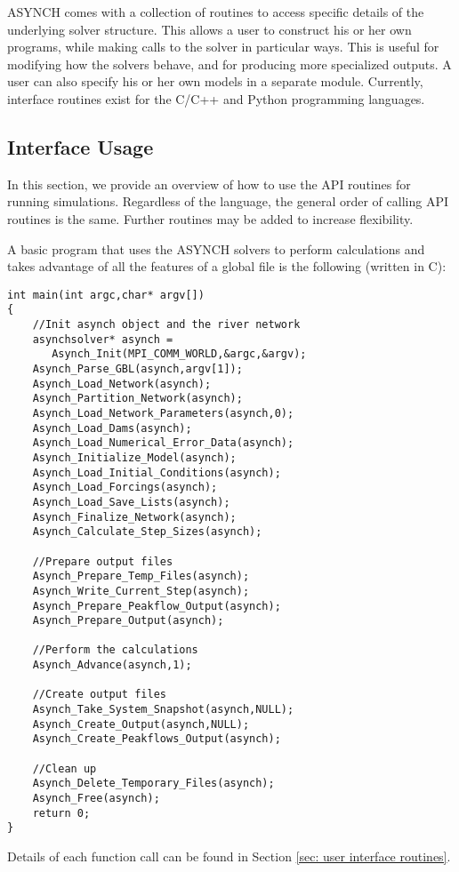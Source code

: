 \documentclass[12pt]{article}
\begin{document}
ASYNCH comes with a collection of routines to access specific details of the underlying solver structure. This allows a user to construct his or her own programs, while making calls to the solver in particular ways. This is useful for modifying how the solvers behave, and for producing more specialized outputs. A user can also specify his or her own models in a separate module. Currently, interface routines exist for the C/C++ and Python programming languages.

\subsection{Interface Usage} \label{sec: interface usage}

In this section, we provide an overview of how to use the API routines for running simulations. Regardless of the language, the general order of calling API routines is the same. Further routines may be added to increase flexibility.

A basic program that uses the ASYNCH solvers to perform calculations and takes advantage of all the features of a global file is the following (written in C):
\begin{lstlisting}[style=CStyle]
int main(int argc,char* argv[])
{
	//Init asynch object and the river network
	asynchsolver* asynch = 
	   Asynch_Init(MPI_COMM_WORLD,&argc,&argv);
	Asynch_Parse_GBL(asynch,argv[1]);
	Asynch_Load_Network(asynch);
	Asynch_Partition_Network(asynch);
	Asynch_Load_Network_Parameters(asynch,0);
	Asynch_Load_Dams(asynch);
	Asynch_Load_Numerical_Error_Data(asynch);
	Asynch_Initialize_Model(asynch);
	Asynch_Load_Initial_Conditions(asynch);
	Asynch_Load_Forcings(asynch);
	Asynch_Load_Save_Lists(asynch);
	Asynch_Finalize_Network(asynch);
	Asynch_Calculate_Step_Sizes(asynch);

	//Prepare output files
	Asynch_Prepare_Temp_Files(asynch);
	Asynch_Write_Current_Step(asynch);
	Asynch_Prepare_Peakflow_Output(asynch);
	Asynch_Prepare_Output(asynch);

	//Perform the calculations
	Asynch_Advance(asynch,1);

	//Create output files
	Asynch_Take_System_Snapshot(asynch,NULL);
	Asynch_Create_Output(asynch,NULL);
	Asynch_Create_Peakflows_Output(asynch);

	//Clean up
	Asynch_Delete_Temporary_Files(asynch);
	Asynch_Free(asynch);
	return 0;
}
\end{lstlisting}
Details of each function call can be found in Section \ref{sec: user interface routines}.
\end{document}

